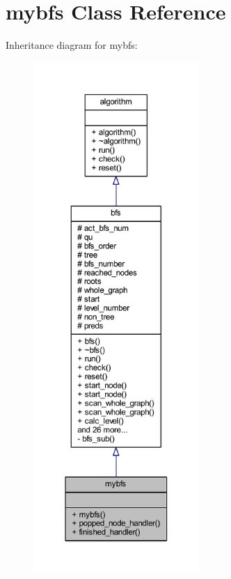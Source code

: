 \hypertarget{classmybfs}{}\section{mybfs Class Reference}
\label{classmybfs}


Inheritance diagram for mybfs\+:\nopagebreak
\begin{figure}[H]
\begin{center}
\leavevmode
\includegraphics[height=550pt]{classmybfs__inherit__graph}
\end{center}
\end{figure}


